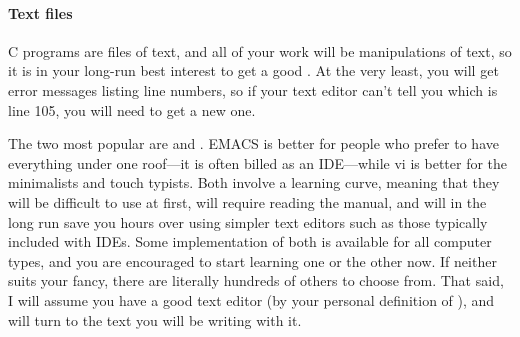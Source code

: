 

\paragraph{Text files} C programs are files of text, and all of your work
will be manipulations of text, so it is in your long-run best interest to
get a good . At the very least, you will get error messages
listing line numbers, so if your text editor can't tell you which is
line 105, you will need to get a new one.

The two most popular are  and . EMACS is better for
people who prefer to have everything under one roof---it is often billed
as an IDE---while vi is better for the minimalists and touch typists. Both
involve a learning curve, meaning that they will be difficult to use at
first, will require reading the manual, and will in the long run save
you hours over using simpler text editors such as those typically
included with IDEs. Some implementation of both is available for all
computer types, and you are encouraged to start learning one or the other
now. If neither suits your fancy, there are literally hundreds of others
to choose from. That said, I will assume you have a good text editor
(by your personal definition of ), and will turn to the text you
will be writing with it.

